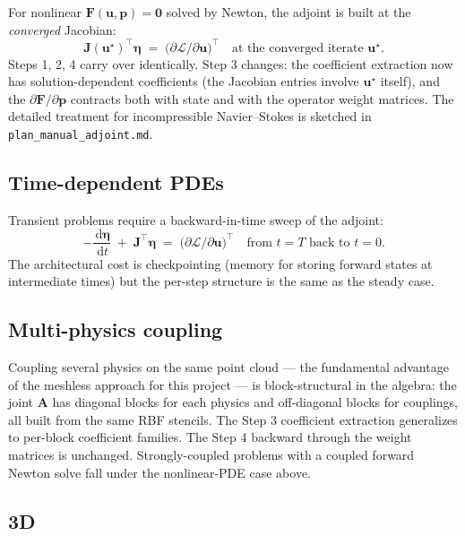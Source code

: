 \documentclass[11pt,a4paper]{article}
\newcommand{\mat}[1]{\mathbf{#1}}
\newcommand{\vect}[1]{\boldsymbol{#1}}
\newcommand{\pts}{\vect{p}}
\newcommand{\dd}{\,\mathrm{d}}
\newcommand{\Loss}{\mathcal{L}}
\begin{document}
For nonlinear $\vect F(\vect u, \pts) = \vect 0$ solved by Newton,
the adjoint is built at the \emph{converged} Jacobian:
\begin{equation}
  \mat J(\vect u^\star)^\top \vect\eta
  \;=\; \big(\partial\Loss/\partial\vect u\big)^\top
  \quad \text{at the converged iterate } \vect u^\star.
\end{equation}
Steps 1, 2, 4 carry over identically. Step 3 changes: the
coefficient extraction now has solution-dependent coefficients
(the Jacobian entries involve $\vect u^\star$ itself), and the
$\partial\mat F/\partial\pts$ contracts both with state and with
the operator weight matrices. The detailed treatment for
incompressible Navier--Stokes is sketched in
\texttt{plan\_manual\_adjoint.md}.

\subsection{Time-dependent PDEs}

Transient problems require a backward-in-time sweep of the
adjoint:
\begin{equation}
  -\frac{\dd\vect\eta}{\dd t}
  \;+\; \mat J^\top \vect\eta
  \;=\; \big(\partial\Loss/\partial\vect u\big)^\top
  \quad \text{from } t=T \text{ back to } t=0.
\end{equation}
The architectural cost is checkpointing (memory for storing
forward states at intermediate times) but the per-step structure
is the same as the steady case.

\subsection{Multi-physics coupling}

Coupling several physics on the same point cloud --- the
fundamental advantage of the meshless approach for this project
--- is block-structural in the algebra: the joint $\mat A$ has
diagonal blocks for each physics and off-diagonal blocks for
couplings, all built from the same RBF stencils. The Step 3
coefficient extraction generalizes to per-block coefficient
families. The Step 4 backward through the weight matrices is
unchanged. Strongly-coupled problems with a coupled forward
Newton solve fall under the nonlinear-PDE case above.

\subsection{3D}
\end{document}
